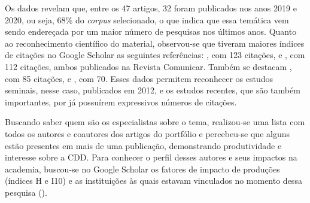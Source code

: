 \documentclass[portuguese]{textolivre}
\begin{document}
Os dados revelam que, entre os 47 artigos, 32 foram publicados nos anos 2019 e 2020, ou seja, 68\% do \textit{corpus} selecionado, o que indica que essa temática vem sendo endereçada por um maior número de pesquisas nos últimos anos. Quanto ao reconhecimento científico do material, observou-se que tiveram maiores índices de citações no Google Scholar as seguintes referências: \textcite{gutierrez_media_2012}, com 123 citações, e \textcite{perez_competencia_2012}, com 112 citações, ambos publicados na Revista Comunicar. Também se destacam \textcite{pettersson_issues_2018}, com 85 citações, e \textcite{spante_digital_2018}, com 70. Esses dados permitem reconhecer os estudos seminais, nesse caso, publicados em 2012, e os estudos recentes, que são também importantes, por já possuírem expressivos números de citações.

Buscando saber quem são os especialistas sobre o tema, realizou-se uma lista com todos os autores e coautores dos artigos do portfólio e percebeu-se que alguns estão presentes em mais de uma publicação, demonstrando produtividade e interesse sobre a CDD. Para conhecer o perfil desses autores e seus impactos na academia, buscou-se no Google Scholar os fatores de impacto de produções (índices H e I10) e as instituições às quais estavam vinculados no momento dessa pesquisa ().
\end{document}
